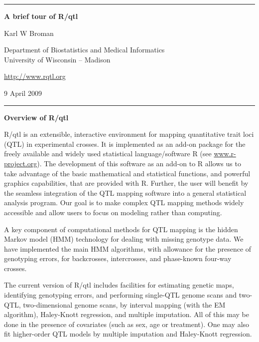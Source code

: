 \documentclass[10pt,letterpaper]{article}
\begin{document}
\begin{center}
\rule{7.0in}{1mm} \vspace{0mm}

{\Large \textbf{A brief tour of R/qtl}} \vspace{4mm}

{\large Karl W Broman} \vspace{2mm}

Department of Biostatistics and Medical Informatics\\
University of Wisconsin -- Madison

\vspace{2mm}
\href{http://www.rqtl.org}{http://www.rqtl.org}
\vspace{2mm}

9 April 2009 %

\rule{7.0in}{1mm} 
\end{center}

\noindent \textbf{Overview of R/qtl} \vspace{6pt}

R/qtl is an extensible, interactive environment for mapping
quantitative trait loci (QTL) in experimental crosses. It is
implemented as an add-on package for the freely available and widely
used statistical language/software R (see
\href{http://www.r-project.org}{www.r-project.org}). The development
of this software as an add-on to R allows us to take advantage of the
basic mathematical and statistical functions, and powerful graphics
capabilities, that are provided with R. Further, the user will benefit
by the seamless integration of the QTL mapping software into a general
statistical analysis program.  Our goal is to make complex QTL mapping
methods widely accessible and allow users to focus on modeling rather
than computing.

A key component of computational methods for QTL mapping is the hidden
Markov model (HMM) technology for dealing with missing genotype
data. We have implemented the main HMM algorithms, with allowance for
the presence of genotyping errors, for backcrosses, intercrosses, and
phase-known four-way crosses.

The current version of R/qtl includes facilities for estimating
genetic maps, identifying genotyping errors, and performing single-QTL
genome scans and two-QTL, two-dimensional genome scans, by interval
mapping (with the EM algorithm), Haley-Knott regression, and multiple
imputation. All of this may be done in the presence of covariates
(such as sex, age or treatment). One may also fit higher-order QTL models
by multiple imputation and Haley-Knott regression.
\end{document}
